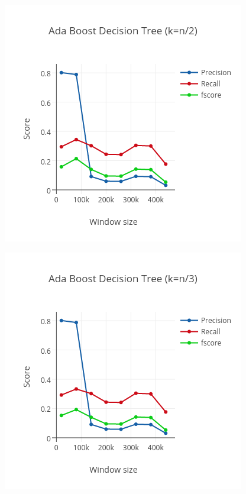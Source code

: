 \documentclass[letterpaper,11pt]{article}
\begin{document}
\begin{figure}
\centering
\begin{minipage}{.45\linewidth}
  \includegraphics[width=\linewidth]{../data_mapred/img/truncated/adr2.png}
  \label{fig:adr2}
\end{minipage}
\begin{minipage}{.45\linewidth}
  \includegraphics[width=\linewidth]{../data_mapred/img/truncated/adr3.png}

\end{minipage}
\end{figure}
\end{document}
